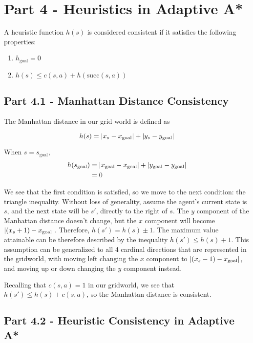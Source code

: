 \documentclass[12pt]{article}
\begin{document}
\section{Part 4 - Heuristics in Adaptive A*}

A heuristic function 
$h(s)$ 
is considered consistent if it satisfies the following properties:

\begin{enumerate}
    \item $h_{\text{goal}} = 0$
    \item $h(s) \leq c(s, a) + h(\text{succ} (s, a))$
\end{enumerate}

\subsection{Part 4.1 - Manhattan Distance Consistency}

The Manhattan distance in our grid world is defined as

$$
h(s) = \left\lvert x_s - x_{\text{goal}} \right\rvert + \left\lvert y_s - y_{\text{goal}} \right\rvert
$$

When $s = s_\text{goal}$,
\begin{align*}
h(s_\text{goal}) &= \left\lvert x_{\text{goal}} - x_{\text{goal}} \right\rvert + \left\lvert y_{\text{goal}} - y_{\text{goal}} \right\rvert \\
&= 0\
\end{align*}

We see that the first condition is satisfied,
so we move to the next condition:
the triangle inequality.
Without loss of generality,
assume the agent's current state is $s$,
and the next state will be $s'$,
directly to the right of $s$.
The $y$ component of the Manhattan distance doesn't change,
but the $x$ component will become 
$\left\lvert(x_s + 1) - x_{\text{goal}} \right\rvert$.
Therefore,
$h(s') = h(s) \pm 1$.
The maximum value attainable can be therefore described by the inequality 
$h(s') \leq h(s) + 1$.
This assumption can be generalized to all 4 cardinal directions that are represented in the gridworld,
with moving left changing the $x$ component to $\left\lvert(x_s - 1) - x_{\text{goal}} \right\rvert$,
and moving up or down changing the $y$ component instead.

Recalling that $c(s, a) = 1$ in our gridworld,
we see that $h(s') \leq h(s) + c(s, a)$,
so the Manhattan distance is consistent.

\subsection{Part 4.2 - Heuristic Consistency in Adaptive A*}
\end{document}
